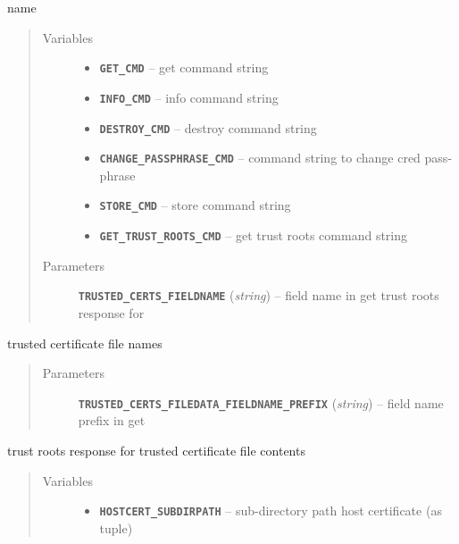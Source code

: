 \documentclass[letterpaper,10pt,english]{sphinxmanual}
\begin{document}
\begin{fulllineitems}
name
\begin{quote}\begin{description}
\item[{Variables}] \leavevmode\begin{itemize}
\item {} 
\textbf{\texttt{GET\_CMD}} -- get command string

\item {} 
\textbf{\texttt{INFO\_CMD}} -- info command string

\item {} 
\textbf{\texttt{DESTROY\_CMD}} -- destroy command string

\item {} 
\textbf{\texttt{CHANGE\_PASSPHRASE\_CMD}} -- command string to change cred pass-phrase

\item {} 
\textbf{\texttt{STORE\_CMD}} -- store command string

\item {} 
\textbf{\texttt{GET\_TRUST\_ROOTS\_CMD}} -- get trust roots command string

\end{itemize}

\item[{Parameters}] \leavevmode
\textbf{\texttt{TRUSTED\_CERTS\_FIELDNAME}} (\emph{string}) -- field name in get trust roots response for

\end{description}\end{quote}

trusted certificate file names
\begin{quote}\begin{description}
\item[{Parameters}] \leavevmode
\textbf{\texttt{TRUSTED\_CERTS\_FILEDATA\_FIELDNAME\_PREFIX}} (\emph{string}) -- field name prefix in get

\end{description}\end{quote}

trust roots response for trusted certificate file contents
\begin{quote}\begin{description}
\item[{Variables}] \leavevmode\begin{itemize}
\item {} 
\textbf{\texttt{HOSTCERT\_SUBDIRPATH}} -- sub-directory path host certificate (as tuple)


\end{itemize}
\end{description}
\end{quote}
\end{fulllineitems}
\end{document}
